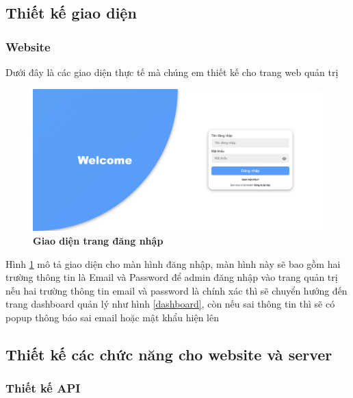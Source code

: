 \subsection{Thiết kế giao diện}

\subsubsection{Website}

Dưới đây là các giao diện thực tế mà chúng em thiết kế cho trang web quản trị


\begin{figure}[H]
  \centering
  \includegraphics[scale=0.7]{Images/server/webUI/login.PNG}
  \caption[Giao diện trang đăng nhập]{\bfseries \fontsize{12pt}{0pt}\selectfont Giao diện trang đăng nhập}
  \label{login} %
\end{figure}

Hình \ref{login} mô tả giao diện cho màn hình đăng nhập, màn hình này sẽ bao
 gồm hai trường thông tin là Email và Password để admin đăng nhập vào trang quản trị
 nếu hai trường thông tin email và password là chính xác thì sẽ chuyển hướng đến trang dashboard 
 quản lý như hình \ref{dashboard}, còn nếu sai thông tin thì sẽ có popup thông báo sai email hoặc mật khẩu hiện lên
 

\subsection{Thiết kế các chức năng cho website và server}

\subsubsection{Thiết kế API}


